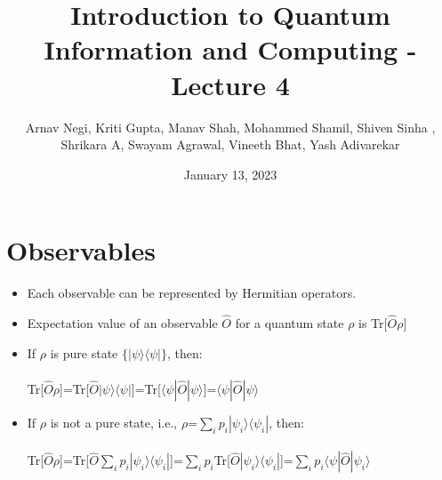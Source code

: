 \documentclass{article}
\title{Introduction to Quantum Information and Computing - Lecture 4}
\author{Arnav Negi, Kriti Gupta, Manav Shah, Mohammed Shamil, Shiven Sinha ,\\Shrikara A, Swayam Agrawal, Vineeth Bhat, Yash Adivarekar}
\date{January 13, 2023}
\begin{document}
\maketitle

\section{Observables}
\begin{itemize}
    \item Each observable can be represented by Hermitian operators.
\end{itemize}
\begin{itemize}
    \item Expectation value of an observable ${\hat{O}}$ for a quantum state $\rho$  is Tr[${\hat{O}\rho}$]
\end{itemize}
\begin{itemize}
    \item If $\rho$ is pure state {$\{|\psi\rangle\langle\psi|\}$}, then:\\\\
Tr[${\hat{O}\rho}$]=Tr[${\hat{O}|\psi\rangle\langle\psi|}$]=Tr[${\langle\psi|\hat{O}|\psi\rangle}$]=${\langle\psi|\hat{O}|\psi\rangle}$
\end{itemize}
\begin{itemize}
    \item If $\rho$ is not a pure state, i.e., $\rho$=$\sum\limits_{i}p_{i}|\psi_{i}\rangle\langle\psi_{i}|$, then:\\\\
Tr[${\hat{O}\rho}$]=Tr[${\hat{O}\sum\limits_{i}p_{i}|\psi_{i}\rangle\langle\psi_{i}|}$]=$\sum\limits_{i}p_{i}$Tr[${\hat{O}|\psi_{i}\rangle\langle\psi_{i}|}$]=$\sum\limits_{i}p_{i}\langle\psi|\hat{O}|\psi_{i}\rangle$

\end{itemize}
\end{document}
